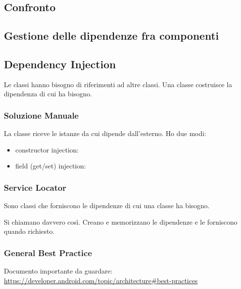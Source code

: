 \subsection{Confronto}
\subsection{Gestione delle dipendenze fra componenti}
\subsection{Dependency Injection}
\par Le classi hanno bisogno di riferimenti ad altre classi. Una classe costruisce la dipendenza di cui ha bisogno.

\subsubsection{Soluzione Manuale}
\par La classe riceve le istanze da cui dipende dall'esterno. Ho due modi:
\begin{itemize}
    \item constructor injection: %
    \item field (get/set) injection: %
\end{itemize}

\subsubsection{Service Locator}
\par Sono classi che forniscono le dipendenze di cui una classe ha bisogno. %
\par Si chiamano davvero così. Creano e memorizzano le dipendenze e le forniscono quando richiesto.

\subsubsection{General Best Practice}
\par Documento importante da guardare: \url{https://developer.android.com/topic/architecture#best-practices}